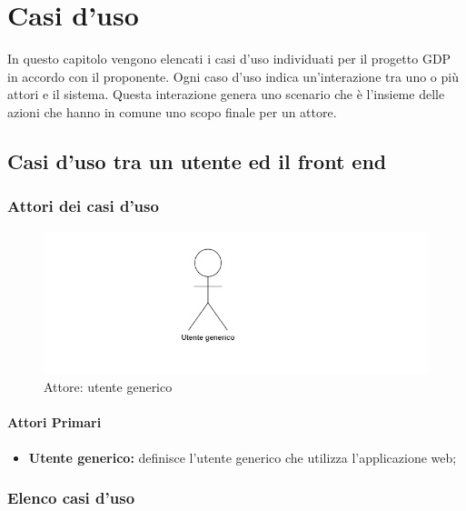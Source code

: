\chapter{Casi d'uso}\label{casiDuso}
In questo capitolo vengono elencati i casi d'uso individuati per il progetto GDP in accordo con il proponente. Ogni caso d'uso indica un'interazione tra uno o più attori e il sistema. Questa interazione genera uno scenario che è l'insieme delle azioni che hanno in comune uno scopo finale per un attore.

\section{Casi d'uso tra un utente ed il front end}
\subsection{Attori dei casi d'uso}
\begin{center}
	\begin{figure}[H]
		\includegraphics{../immagini/attori_casi/utente_generico.png}
		\caption{Attore: utente generico}
	\end{figure}
\end{center}
\subsubsection{Attori Primari}\label{UFattoriPrimari}
\begin{itemize}
	\item \textbf{Utente generico:} definisce l'utente generico che utilizza l'applicazione web;
\end{itemize}

\subsection{Elenco casi d'uso}\label{UFelencoCasiDuso}


